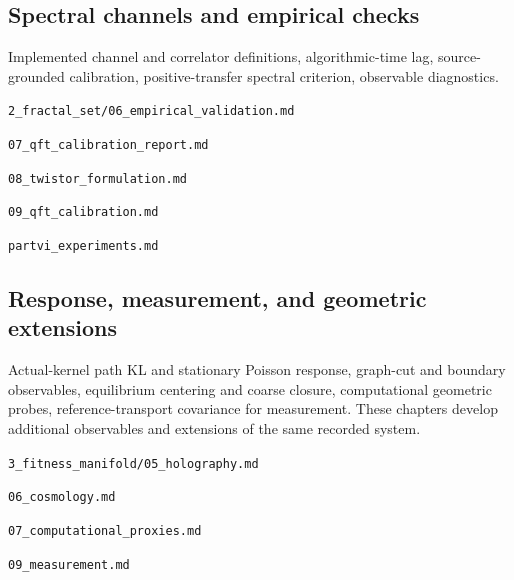 \documentclass[11pt,a4paper]{article}
\begin{document}
\par\medskip\noindent\begin{minipage}{\linewidth}
\subsection*{Spectral channels and empirical checks}
Implemented channel and correlator definitions, algorithmic-time lag, source-grounded calibration, positive-transfer spectral criterion, observable diagnostics.

{\small\nolinkurl{2_fractal_set/06_empirical_validation.md}\par}
{\small\nolinkurl{07_qft_calibration_report.md}\par}
{\small\nolinkurl{08_twistor_formulation.md}\par}
{\small\nolinkurl{09_qft_calibration.md}\par}
{\small\nolinkurl{partvi_experiments.md}\par}
\end{minipage}\par
\par\medskip\noindent\begin{minipage}{\linewidth}
\subsection*{Response, measurement, and geometric extensions}
Actual-kernel path KL and stationary Poisson response, graph-cut and boundary observables, equilibrium centering and coarse closure, computational geometric probes, reference-transport covariance for measurement. These chapters develop additional observables and extensions of the same recorded system.

{\small\nolinkurl{3_fitness_manifold/05_holography.md}\par}
{\small\nolinkurl{06_cosmology.md}\par}
{\small\nolinkurl{07_computational_proxies.md}\par}
{\small\nolinkurl{09_measurement.md}\par}
\end{minipage}\par
\end{document}
